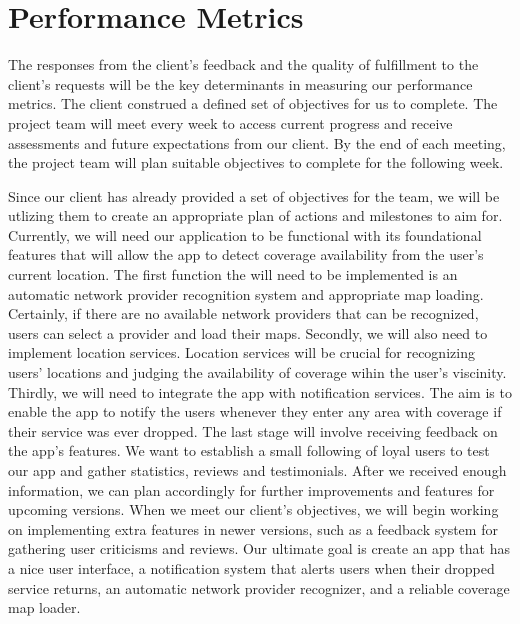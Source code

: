 \documentclass[letterpaper,10pt,draftclsnofoot,onecolumn]{IEEEtran}
\begin{document}
\section*{Performance Metrics}
The responses from the client's feedback and the quality of fulfillment to the client's requests
will be the key determinants in measuring our performance metrics. The client construed a defined set of objectives 
for us to complete. The project team will meet every week to access current progress and receive assessments and
future expectations from our client. By the end of each meeting, the project team will plan suitable objectives to complete for the following week. 
\par
Since our client has already provided a set of objectives for the team, we will be utlizing them to create an appropriate
plan of actions and milestones to aim for. Currently, we will need our application to be functional with its foundational features that will
allow the app to detect coverage availability from the user's current location. The first 
function the will need to be implemented is an automatic network provider recognition system and 
appropriate map loading. Certainly, if there are no available network providers that can be recognized, 
users can select a provider and load their maps. Secondly, we will also need to implement location 
services. Location services will be crucial for recognizing users’ locations and judging the availability
of coverage wihin the user's viscinity. Thirdly, we will need to integrate the app with notification services. The aim is to 
enable the app to notify the users whenever they enter any area with coverage if their service was ever dropped. 
The last stage will involve receiving feedback on the app's features. We want to establish a small following of loyal users 
to test our app and gather statistics, reviews and testimonials. After we 
received enough information, we can plan accordingly for further improvements and features for 
upcoming versions. When we meet our client's objectives, we will begin working on implementing extra features in newer versions, such as
a feedback system for gathering user criticisms and reviews. 
Our ultimate goal is create an app that has a nice user interface, a notification system that alerts 
users when their dropped service returns, an automatic network provider recognizer, and a reliable coverage map loader. 




\end{document}
